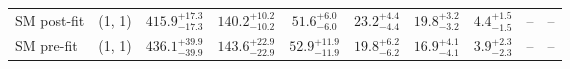 \begin{table}[h!]
{\begin{tabular}{lccccccccc}
	SM post-fit & (1, 1)       & $415.9^{+ 17.3 }_{- 17.3 }$     & $140.2^{+ 10.2 }_{- 10.2 }$    & $51.6^{+ 6.0 }_{- 6.0 }$       & $23.2^{+ 4.4 }_{- 4.4 }$    & $19.8^{+ 3.2 }_{- 3.2 }$    & $4.4^{+ 1.5 }_{- 1.5 }$     & --                         & --           \\[0.5ex] 
	SM pre-fit  & (1, 1)       & $436.1^{+ 39.9 }_{- 39.9 }$     & $143.6^{+ 22.9 }_{- 22.9 }$    & $52.9^{+ 11.9 }_{- 11.9 }$     & $19.8^{+ 6.2 }_{- 6.2 }$    & $16.9^{+ 4.1 }_{- 4.1 }$    & $3.9^{+ 2.3 }_{- 2.3 }$     & --                         & --           \\[0.5ex] 
	\hline
	\hline
\end{tabular}}
\end{table}
